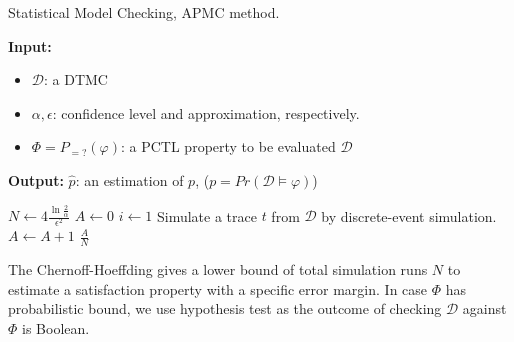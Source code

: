 \begin{algorithm}[H]
      \caption{Statistical Model Checking, APMC method.}
      \label{alg:smc-apmc}
      \footnotesize{
            \hspace*{\algorithmicindent} \textbf{Input:}
            \begin{itemize}[noitemsep,topsep=0pt]
                  \item $\mathcal{D}$: a DTMC
                  \item $\alpha, \epsilon$: confidence level and approximation, respectively.
                  \item $\Phi = P_{=?}(\varphi) $: a PCTL property to be evaluated $\mathcal{D}$
            \end{itemize}
            \hspace*{\algorithmicindent} \textbf{Output:} $\hat{p}$: an estimation of $p$, ($p = Pr(\mathcal{D} \models \varphi)$)
      }
      \begin{algorithmic}[1]
            \State $N \leftarrow 4\frac{\ln{\frac{2}{\alpha}}}{\epsilon^2}$
            \State $A \leftarrow 0$
            \State $i \leftarrow 1$
            \State Simulate a trace $t$ from $\mathcal{D}$ by discrete-event simulation.
            \State $A \leftarrow A + 1$
            \EndIf
            \EndWhile
            \Return $\frac{A}{N}$
            \EndProcedure
      \end{algorithmic}
\end{algorithm}
The Chernoff-Hoeffding gives a lower bound of total simulation runs $N$ to estimate a satisfaction
property with a specific error margin. In case $\Phi$ has probabilistic bound, we use hypothesis
test as the outcome of checking $\mathcal{D}$ against $\Phi$ is Boolean.

